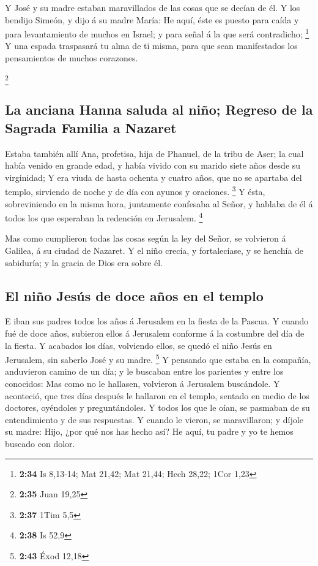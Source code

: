  Y José y su madre estaban maravillados de las cosas que
se decían de él.  Y los bendijo Simeón, y dijo á su madre
María: He aquí, éste es puesto para caída y para levantamiento de muchos
en Israel; y para señal á la que será contradicho; \footnote{\textbf{2:34}
  Is 8,13-14; Mat 21,42; Mat 21,44; Hech 28,22; 1Cor 1,23}
 Y una espada traspasará tu alma de ti misma, para que
sean manifestados los pensamientos de muchos corazones.

\footnote{\textbf{2:35} Juan 19,25}

\hypertarget{la-anciana-hanna-saluda-al-niuxf1o-regreso-de-la-sagrada-familia-a-nazaret}{%
\subsection{La anciana Hanna saluda al niño; Regreso de la Sagrada
Familia a
Nazaret}\label{la-anciana-hanna-saluda-al-niuxf1o-regreso-de-la-sagrada-familia-a-nazaret}}

 Estaba también allí Ana, profetisa, hija de Phanuel, de
la tribu de Aser; la cual había venido en grande edad, y había vivido
con su marido siete años desde su virginidad;  Y era
viuda de hasta ochenta y cuatro años, que no se apartaba del templo,
sirviendo de noche y de día con ayunos y oraciones. \footnote{\textbf{2:37}
  1Tim 5,5}  Y ésta, sobreviniendo en la misma hora,
juntamente confesaba al Señor, y hablaba de él á todos los que esperaban
la redención en Jerusalem. \footnote{\textbf{2:38} Is 52,9}

 Mas como cumplieron todas las cosas según la ley del
Señor, se volvieron á Galilea, á su ciudad de Nazaret.  Y
el niño crecía, y fortalecíase, y se henchía de sabiduría; y la gracia
de Dios era sobre él.

\hypertarget{el-niuxf1o-jesuxfas-de-doce-auxf1os-en-el-templo}{%
\subsection{El niño Jesús de doce años en el
templo}\label{el-niuxf1o-jesuxfas-de-doce-auxf1os-en-el-templo}}

 E iban sus padres todos los años á Jerusalem en la
fiesta de la Pascua.  Y cuando fué de doce años, subieron
ellos á Jerusalem conforme á la costumbre del día de la fiesta.
 Y acabados los días, volviendo ellos, se quedó el niño
Jesús en Jerusalem, sin saberlo José y su madre. \footnote{\textbf{2:43}
  Éxod 12,18}  Y pensando que estaba en la compañía,
anduvieron camino de un día; y le buscaban entre los parientes y entre
los conocidos:  Mas como no le hallasen, volvieron á
Jerusalem buscándole.  Y aconteció, que tres días después
le hallaron en el templo, sentado en medio de los doctores, oyéndoles y
preguntándoles.  Y todos los que le oían, se pasmaban de
su entendimiento y de sus respuestas.  Y cuando le
vieron, se maravillaron; y díjole su madre: Hijo, ¿por qué nos has hecho
así? He aquí, tu padre y yo te hemos buscado con dolor.

